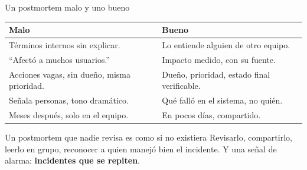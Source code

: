 \documentclass[institutional,screen,none]{ua-engineering-v6-beamer}
\begin{document}
\begin{frame}{Un postmortem malo y uno bueno}
\begin{center}
\small
\begin{tabular}{p{}p{}}
\toprule
\textbf{Malo} & \textbf{Bueno} \\
\midrule
Términos internos sin explicar. & Lo entiende alguien de otro equipo. \\
``Afectó a muchos usuarios.'' & Impacto medido, con su fuente. \\
Acciones vagas, sin dueño, misma prioridad. & Dueño, prioridad, estado final verificable. \\
Señala personas, tono dramático. & Qué falló en el sistema, no quién. \\
Meses después, solo en el equipo. & En pocos días, compartido. \\
\bottomrule
\end{tabular}
\end{center}

\pause

\begin{block}{Un postmortem que nadie revisa es como si no existiera}
Revisarlo, compartirlo, leerlo en grupo, reconocer a quien manejó bien el incidente. Y una señal de alarma: \textbf{incidentes que se repiten}.
\end{block}
\end{frame}

\end{document}
